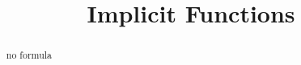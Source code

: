 \documentclass{ximera}
\title{Implicit Functions}
\begin{document}
\begin{abstract}
no formula
\end{abstract}
\maketitle
\end{document}
